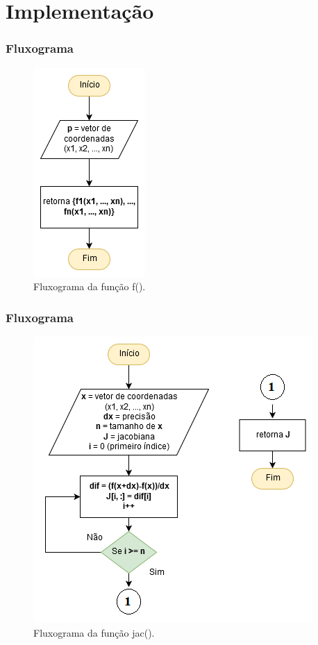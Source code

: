 \documentclass[aspectratio=1610]{beamer}
\begin{document}
\section{Implementação}
\begin{frame}
\frametitle{Fluxograma}


\begin{figure}
  \centering
  \includegraphics[scale=0.6]{Imagens/diag_func.png}
  \caption{Fluxograma da função f().}
\end{figure}


\end{frame}


\begin{frame}
\frametitle{Fluxograma}


\begin{figure}
  \centering
  \includegraphics[scale=0.6]{Imagens/diag_jac1.png}
  \caption{Fluxograma da função jac().}
\end{figure}


\end{frame}
\end{document}
